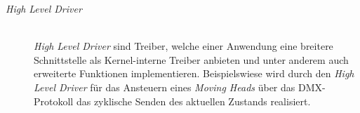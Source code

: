 \begin{description}
	\item[\textit{High Level Driver}] \hfill \\
	\textit{High Level Driver} sind Treiber, welche einer Anwendung eine breitere Schnittstelle als Kernel-interne Treiber anbieten und unter anderem auch erweiterte Funktionen implementieren. Beispielswiese wird durch den \textit{High Level Driver} für das Ansteuern eines \textit{Moving Heads} über das \ac{DMX}-Protokoll das zyklische Senden des aktuellen Zustands realisiert. 
\end{description}

\pagebreak 